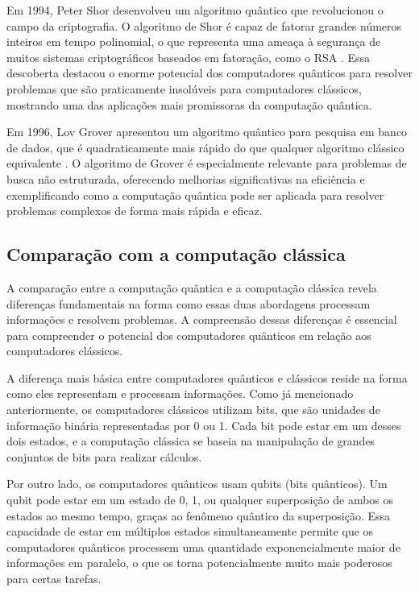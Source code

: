 Em 1994, Peter Shor desenvolveu um algoritmo quântico que revolucionou o campo da criptografia. O algoritmo de Shor é capaz de fatorar grandes números inteiros em tempo polinomial, o que representa uma ameaça à segurança de muitos sistemas criptográficos baseados em fatoração, como o RSA \cite{shor1994algorithms}. Essa descoberta destacou o enorme potencial dos computadores quânticos para resolver problemas que são praticamente insolúveis para computadores clássicos, mostrando uma das aplicações mais promissoras da computação quântica.

Em 1996, Lov Grover apresentou um algoritmo quântico para pesquisa em banco de dados, que é quadraticamente mais rápido do que qualquer algoritmo clássico equivalente \cite{grover1996fast}. O algoritmo de Grover é especialmente relevante para problemas de busca não estruturada, oferecendo melhorias significativas na eficiência e exemplificando como a computação quântica pode ser aplicada para resolver problemas complexos de forma mais rápida e eficaz.

\subsection{Comparação com a computação clássica}

A comparação entre a computação quântica e a computação clássica revela diferenças fundamentais na forma como essas duas abordagens processam informações e resolvem problemas. A compreensão dessas diferenças é essencial para compreender o potencial dos computadores quânticos em relação aos computadores clássicos.

A diferença mais básica entre computadores quânticos e clássicos reside na forma como eles representam e processam informações. Como já mencionado anteriormente, os computadores clássicos utilizam bits, que são unidades de informação binária representadas por 0 ou 1. Cada bit pode estar em um desses dois estados, e a computação clássica se baseia na manipulação de grandes conjuntos de bits para realizar cálculos.

Por outro lado, os computadores quânticos usam qubits (bits quânticos). Um qubit pode estar em um estado de 0, 1, ou qualquer superposição de ambos os estados ao mesmo tempo, graças ao fenômeno quântico da superposição. Essa capacidade de estar em múltiplos estados simultaneamente permite que os computadores quânticos processem uma quantidade exponencialmente maior de informações em paralelo, o que os torna potencialmente muito mais poderosos para certas tarefas.

